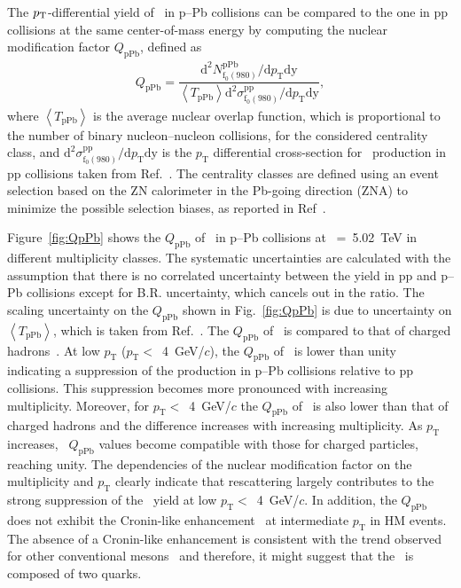The $p_{\rm{T}}$-differential yield of \fzero~in p--Pb collisions can be compared to the one in pp collisions at the same center-of-mass energy by computing the nuclear modification factor $Q_{\mbox{pPb}}$, defined as 
\begin{eqnarray}
Q_{\mbox{pPb}} = \dfrac{\mathrm{d}^{2} N_{\mathrm{f}_{0}(980)}^{\mathrm{pPb}} / \mathrm{d} p_{\mathrm{T}} \mathrm{dy} }{ \left\langle T_{\mathrm{pPb}} \right\rangle \mathrm{d}^{2} \sigma_{\mathrm{f}_{0}(980)}^{\mathrm{pp}}/ \mathrm{d} p_{\mathrm{T}} \mathrm{dy} },
\end{eqnarray}
where $\left\langle T_{\mathrm{pPb}} \right\rangle$ is the average nuclear overlap function, which is proportional to the number of binary nucleon--nucleon collisions, for the considered centrality class, and $\mathrm{d}^{2} \sigma_{\mathrm{f}_{0}(980)}^{\mathrm{pp}}/ \mathrm{d} p_{\mathrm{T}} \mathrm{dy}$ is the $p_{\mathrm{T}}$ differential cross-section for \fzero~production in pp collisions taken from Ref.~\cite{ALICE:2022qnb}. The centrality classes are defined using an event selection based on the ZN calorimeter in the Pb-going direction (ZNA) to minimize the possible selection biases, as reported in Ref~\cite{ALICE:2014xsp}.

Figure~\ref{fig:QpPb} shows the $Q_{\mbox{pPb}}$ of \fzero~in p--Pb collisions at \snn~=~5.02~TeV in different multiplicity classes. The systematic uncertainties are calculated with the assumption that there is no correlated uncertainty between the yield in pp and p--Pb collisions except for B.R. uncertainty, which cancels out in the ratio. The scaling uncertainty on the $Q_{\mbox{pPb}}$ shown in Fig.~\ref{fig:QpPb} is due to uncertainty on $\left\langle T_{\mathrm{pPb}} \right\rangle$, which is taken from Ref.~\cite{ALICE:2014xsp}. The $Q_{\mbox{pPb}}$ of \fzero~is compared to that of charged hadrons~\cite{ALICE:2014xsp}. At low $p_{\mathrm{T}}$ ($p_{\mathrm{T}}<$~4~GeV/$c$), the $Q_{\mbox{pPb}}$ of \fzero~is lower than unity indicating a suppression of the production in p--Pb collisions relative to pp collisions. This suppression becomes more pronounced with increasing multiplicity. Moreover, for $p_{\mathrm{T}}<$~4~GeV/$c$ the $Q_{\mbox{pPb}}$ of \fzero~is also lower than that of charged hadrons and the difference increases with increasing multiplicity. As $p_{\mathrm{T}}$ increases, \fzero~$Q_{\mbox{pPb}}$ values become compatible with those for charged particles, reaching unity. The dependencies of the nuclear modification factor on the multiplicity and $p_{\mathrm{T}}$ clearly indicate that rescattering largely contributes to the strong suppression of the \fzero~yield at low $p_{\mathrm{T}}<$~4~GeV/$c$. In addition, the $Q_{\mbox{pPb}}$ does not exhibit the Cronin-like enhancement~\cite{Cronin:1974zm} at intermediate $p_{\mathrm{T}}$ in HM events. The absence of a Cronin-like enhancement is consistent with the trend observed for other conventional mesons~\cite{ALICE:2016dei, ALICE:2016sak} and therefore, it might suggest that the \fzero~is composed of two quarks.